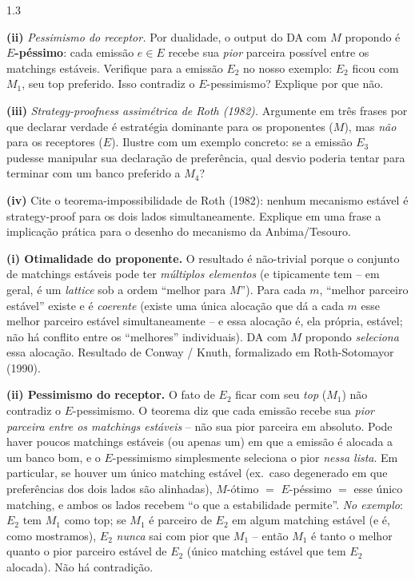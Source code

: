 \documentclass[11pt,addpoints]{exam}
\begin{document}
\begin{spacing}{1.3}
\begin{questions}
\begin{parts}
\textbf{(ii)} \emph{Pessimismo do receptor.} Por dualidade, o output do DA com $M$ propondo é \textbf{$E$-péssimo}: cada emissão $e \in E$ recebe sua \emph{pior} parceira possível entre os matchings estáveis. Verifique para a emissão $E_2$ no nosso exemplo: $E_2$ ficou com $M_1$, seu top preferido. Isso contradiz o $E$-pessimismo? Explique por que não.

\textbf{(iii)} \emph{Strategy-proofness assimétrica de Roth (1982).} Argumente em três frases por que declarar verdade é estratégia dominante para os proponentes ($M$), mas \emph{não} para os receptores ($E$). Ilustre com um exemplo concreto: se a emissão $E_3$ pudesse manipular sua declaração de preferência, qual desvio poderia tentar para terminar com um banco preferido a $M_4$?

\textbf{(iv)} Cite o teorema-impossibilidade de Roth (1982): nenhum mecanismo estável é strategy-proof para os dois lados simultaneamente. Explique em uma frase a implicação prática para o desenho do mecanismo da Anbima/Tesouro.

\begin{solution}
\textbf{(i) Otimalidade do proponente.} O resultado é não-trivial porque o conjunto de matchings estáveis pode ter \emph{múltiplos elementos} (e tipicamente tem -- em geral, é um \emph{lattice} sob a ordem ``melhor para $M$''). Para cada $m$, ``melhor parceiro estável'' existe e é \emph{coerente} (existe uma única alocação que dá a cada $m$ esse melhor parceiro estável simultaneamente -- e essa alocação é, ela própria, estável; não há conflito entre os ``melhores'' individuais). DA com $M$ propondo \emph{seleciona} essa alocação. Resultado de Conway / Knuth, formalizado em Roth-Sotomayor (1990).

\textbf{(ii) Pessimismo do receptor.} O fato de $E_2$ ficar com seu \emph{top} ($M_1$) não contradiz o $E$-pessimismo. O teorema diz que cada emissão recebe sua \emph{pior parceira entre os matchings estáveis} -- não sua pior parceira em absoluto. Pode haver poucos matchings estáveis (ou apenas um) em que a emissão é alocada a um banco bom, e o $E$-pessimismo simplesmente seleciona o pior \emph{nessa lista}. Em particular, se houver um único matching estável (ex.\ caso degenerado em que preferências dos dois lados são alinhadas), $M$-ótimo $=$ $E$-péssimo $=$ esse único matching, e ambos os lados recebem ``o que a estabilidade permite''. \emph{No exemplo}: $E_2$ tem $M_1$ como top; se $M_1$ é parceiro de $E_2$ em algum matching estável (e é, como mostramos), $E_2$ \emph{nunca} sai com pior que $M_1$ -- então $M_1$ é tanto o melhor quanto o pior parceiro estável de $E_2$ (único matching estável que tem $E_2$ alocada). Não há contradição.


\end{solution}
\end{parts}
\end{questions}
\end{spacing}
\end{document}
